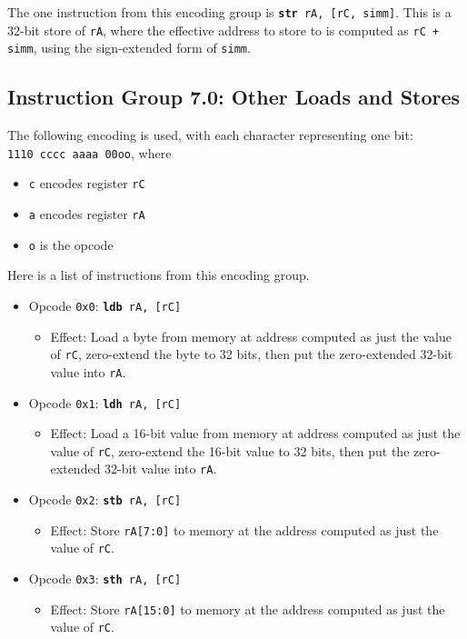 \documentclass{article}
\begin{document}
	The one instruction from this encoding group is
	\texttt{\textbf{str} rA, [rC, simm]}.
	This is a 32-bit store of \texttt{rA}, where the effective address to
	store to is computed as \texttt{rC + simm}, using the sign-extended
	form of \texttt{simm}.

	\subsection{Instruction Group 7.0:  Other Loads and Stores}
	The following encoding is used, with each character representing one
	bit:  \\
	\texttt{1110 cccc aaaa 00oo}, where

	\singlespacing
	\begin{itemize}
		\item \texttt{c} encodes register \texttt{rC}
		\item \texttt{a} encodes register \texttt{rA}
		\item \texttt{o} is the opcode
	\end{itemize}
	\doublespacing

	Here is a list of instructions from this encoding group.

	\singlespacing
	\begin{itemize}
		\item Opcode \texttt{0x0}:
			\texttt{\textbf{ldb} rA, [rC]}
		\begin{itemize}
			\item Effect:  Load a byte from memory at address computed as
			just the value of \texttt{rC}, zero-extend the byte to 32 bits,
			then put the zero-extended 32-bit value into \texttt{rA}.
		\end{itemize}
		\item Opcode \texttt{0x1}:
			\texttt{\textbf{ldh} rA, [rC]}
		\begin{itemize}
			\item Effect:  Load a 16-bit value from memory at address
			computed as just the value of \texttt{rC}, zero-extend the
			16-bit value to 32 bits, then put the zero-extended 32-bit
			value into \texttt{rA}.
		\end{itemize}
		\item Opcode \texttt{0x2}:
			\texttt{\textbf{stb} rA, [rC]}
		\begin{itemize}
			\item Effect:  Store \texttt{rA[7:0]} to memory at the address
			computed as just the value of \texttt{rC}.
		\end{itemize}
		\item Opcode \texttt{0x3}:
			\texttt{\textbf{sth} rA, [rC]}
		\begin{itemize}
			\item Effect:  Store \texttt{rA[15:0]} to memory at the address
			computed as just the value of \texttt{rC}.
		\end{itemize}
	\end{itemize}
	\doublespacing
\end{document}
